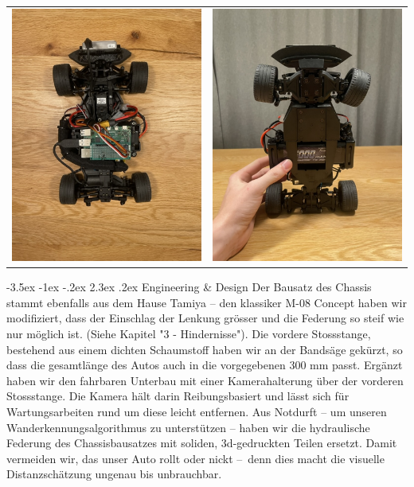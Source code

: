 \documentclass[a4paper]{scrarticle}
\makeatletter
\renewcommand\section{\@startsection {section}{1}{\z@}%
                                   {-3.5ex \@plus -1ex \@minus -.2ex}%
                                   {2.3ex \@plus.2ex}%
                                   {\Huge\AKAfont}}
\makeatother
\begin{document}
\begin{center}
\begin{tabular}{ c c }
		\includegraphics[width=7cm]{top.jpeg} & \includegraphics[width=7cm]{bottom.jpeg}    
	\end{tabular}
	\end{center}
\clearpage

\section{Engineering \& Design}
Der Bausatz des Chassis stammt ebenfalls aus dem Hause Tamiya – den klassiker M-08 Concept haben wir modifiziert, dass der Einschlag der Lenkung grösser und die Federung so steif wie nur möglich ist. (Siehe Kapitel "3 - Hindernisse"). 
Die vordere Stossstange, bestehend aus einem dichten Schaumstoff haben wir an der Bandsäge gekürzt, so dass die gesamtlänge des Autos auch in die vorgegebenen 300 mm passt.
Ergänzt haben wir den fahrbaren Unterbau mit einer Kamerahalterung über der vorderen Stossstange. Die Kamera hält darin Reibungsbasiert und lässt sich für Wartungsarbeiten rund um diese leicht entfernen.
Aus Notdurft – um unseren Wanderkennungsalgorithmus zu unterstützen – haben wir die hydraulische Federung des Chassisbausatzes mit soliden, 3d-gedruckten Teilen ersetzt. Damit vermeiden wir, das unser Auto rollt oder nickt – denn dies macht die visuelle Distanzschätzung ungenau bis unbrauchbar.
\end{document}

